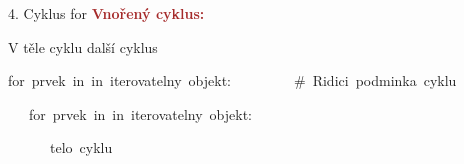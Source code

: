 \documentclass[czech]{beamer}
\newenvironment{lyxcode}
  {\par\begin{list}{}{
    \setlength{\rightmargin}{\leftmargin}
    \setlength{\listparindent}{0pt}%
    \raggedright
    \setlength{\itemsep}{0pt}
    \setlength{\parsep}{0pt}
    \normalfont\ttfamily}%
   \def\{{\char`\{}
   \def\}{\char`\}}
   \def\textasciitilde{\char`\~}
   \item[]}
  {\end{list}}
\begin{document}
\begin{frame}[plain]{4. Cyklus for}
{\scriptsize\textbf{\textcolor{brown}{Vnořený cyklus:}}}{\scriptsize\par}

{\scriptsize V těle cyklu další cyklus}{\scriptsize\par}
\begin{lyxcode}
{\scriptsize for~prvek~in~in~iterovatelny~objekt:~~~~~~~~~\#~Ridici~podminka~cyklu}{\scriptsize\par}

{\scriptsize ~~~for~prvek~in~in~iterovatelny~objekt:~}{\scriptsize\par}

{\scriptsize ~~~~~~telo~cyklu}{\scriptsize\par}
\end{lyxcode}
\end{frame}
\end{document}

